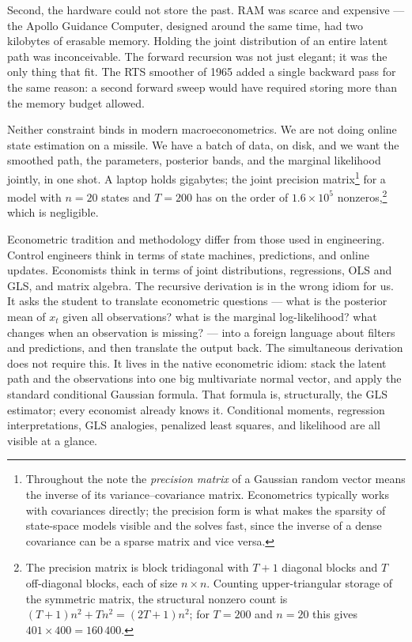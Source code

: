 \documentclass[11pt]{article}
\begin{document}
Second, the hardware could not store the past.  RAM was scarce and
expensive --- the Apollo Guidance Computer, designed around the same
time, had two kilobytes of erasable memory.  Holding the joint
distribution of an entire latent path was inconceivable.  The forward
recursion was not just elegant; it was the only thing that fit.  The
RTS smoother of 1965 added a single backward pass for the same reason:
a second forward sweep would have required storing more than the memory
budget allowed.

Neither constraint binds in modern macroeconometrics.  We are not doing
online state estimation on a missile.  We have a batch of data, on disk,
and we want the smoothed path, the parameters, posterior bands, and the
marginal likelihood jointly, in one shot.  A laptop holds gigabytes; the
joint precision matrix\footnote{Throughout the note the \emph{precision
matrix} of a Gaussian random vector means the inverse of its
variance--covariance matrix.  Econometrics typically works with
covariances directly; the precision form is what makes the sparsity of
state-space models visible and the solves fast, since the inverse of a
dense covariance can be a sparse matrix and vice versa.} for a model
with $n=20$ states and $T=200$ has on the order of $1.6\times 10^5$
nonzeros,\footnote{The precision matrix is block tridiagonal with
$T+1$ diagonal blocks and $T$ off-diagonal blocks, each of size
$n\times n$.  Counting upper-triangular storage of the symmetric
matrix, the structural nonzero count is $(T+1)n^2+Tn^2=(2T+1)n^2$;
for $T=200$ and $n=20$ this gives $401\times 400=160\,400$.}
which is negligible.

Econometric tradition and methodology differ from those used in
engineering.  Control engineers think in terms
of state machines, predictions, and online updates.  Economists think in
terms of joint distributions, regressions, OLS and GLS, and matrix
algebra.  The recursive derivation is in the wrong idiom for us.  It
asks the student to translate econometric questions --- what is the
posterior mean of $x_t$ given all observations? what is the marginal
log-likelihood? what changes when an observation is missing? --- into a
foreign language about filters and predictions, and then translate the
output back.  The simultaneous derivation does not require this.  It
lives in the native econometric idiom: stack the latent path and the
observations into one big multivariate normal vector, and apply the
standard conditional Gaussian formula.  That formula is, structurally,
the GLS estimator; every economist already knows it.  Conditional
moments, regression interpretations, GLS analogies, penalized least
squares, and likelihood are all visible at a glance.
\end{document}
